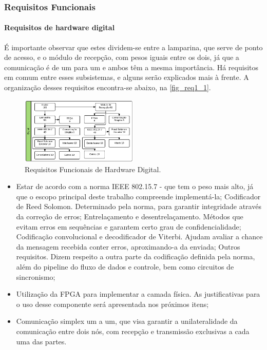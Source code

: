 	\subsubsection{Requisitos Funcionais}\label{subsubsec-requisitos-func}
	
	\paragraph{Requisitos de hardware digital} 
	
	É importante observar que estes dividem-se entre a lamparina, que serve de ponto de acesso, e o módulo de recepção, com pesos iguais entre os dois, já que a comunicação é de um para um e ambos têm a mesma importância. Há requisitos em comum entre esses subsistemas, e alguns serão explicados mais à frente. A organização desses requisitos encontra-se abaixo, na \autoref{fig_req1_1}.
	
	\begin{figure}[h!]
		\caption{\label{fig_req1_1}Requisitos Funcionais de Hardware Digital.}
		\centering
		\includegraphics[width=0.5\textwidth]{Req_Tree_Digital.pdf}
	\end{figure}

	\begin{itemize}  
		\item Estar de acordo com a norma IEEE 802.15.7 - que tem o peso mais alto, já que o escopo principal deste trabalho compreende implementá-la;
		\subitem Codificador de Reed Solomon. Determinado pela norma, para garantir integridade através da correção de erros;
		\subitem Entrelaçamento e desentrelaçamento. Métodos que evitam erros em sequências e garantem certo grau de confidencialidade;
		\subitem Codificação convolucional e decodificador de Viterbi. Ajudam avaliar a chance da mensagem recebida conter erros, aproximando-a da enviada;
		\subitem Outros requisitos. Dizem respeito a outra parte da codificação definida pela norma, além do pipeline do fluxo de dados e controle, bem como circuitos de sincronismo;
		\item Utilização da FPGA para implementar a camada física. As justificativas para o uso desse componente será apresentada nos próximos itens;
		\item Comunicação simplex um a um, que visa garantir a unilateralidade da comunicação entre dois nós, com recepção e transmissão exclusivas a cada uma das partes.
	\end{itemize}
	
